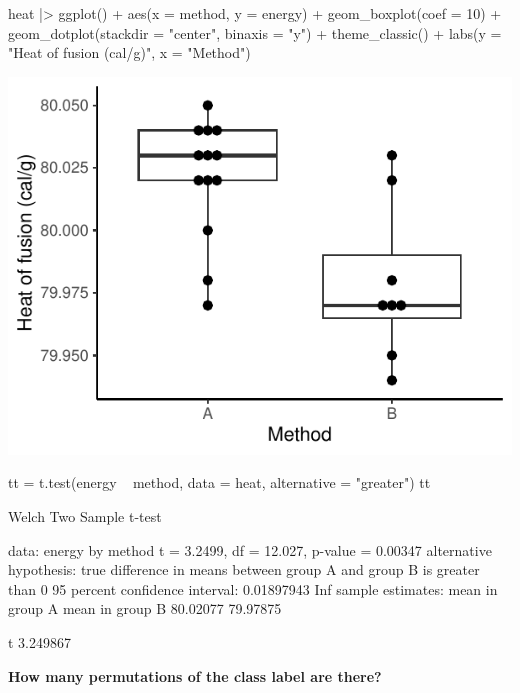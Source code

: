 \documentclass[a4paper]{article}
\begin{document}
\begin{Schunk}
\begin{Sinput}
heat |> ggplot() + 
  aes(x = method, y = energy) + 
  geom_boxplot(coef = 10) + 
  geom_dotplot(stackdir = "center", binaxis = "y") +
  theme_classic() +
  labs(y = "Heat of fusion (cal/g)", x = "Method")
\end{Sinput}


{\centering \includegraphics[width=\maxwidth]{figure/listings-unnamed-chunk-148-1} 

}

\begin{Sinput}
tt = t.test(energy ~ method, data = heat, alternative = "greater")
tt
\end{Sinput}
\begin{Soutput}

	Welch Two Sample t-test

data:  energy by method
t = 3.2499, df = 12.027, p-value = 0.00347
alternative hypothesis: true difference in means between group A and group B is greater than 0
95 percent confidence interval:
 0.01897943        Inf
sample estimates:
mean in group A mean in group B 
       80.02077        79.97875 
\end{Soutput}
\begin{Soutput}
       t 
3.249867 
\end{Soutput}
\end{Schunk}
\begin{greenbox}
	\textbf{How many permutations of the class label are there?}
\end{greenbox}
\end{document}
